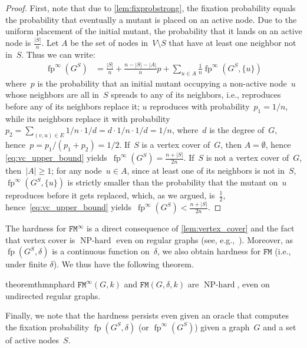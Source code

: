 \documentclass[letterpaper]{article}
\newcommand{\fp}{\operatorname{fp}}
\newcommand{\NodeActivationMoran}{\texttt{FM}}
\newcommand{\NodeActivationMoranStrong}{\texttt{FM}^{\infty}}
\newcommand{\FitAdv}{\delta}
\newcommand{\NPH}{\operatorname{NP-hard}}
\begin{document}
\begin{proof}
First, note that due to \cref{lem:fixprobstrong}, the fixation probability equals the probability that eventually a mutant is placed on an active node. Due to the uniform placement of the initial mutant, the probability that it lands on an active node is $\frac{|S|}{n}$.
Let $A$ be the set of nodes in~$V\setminus S$ that have at least one neighbor not in~$S$.
Thus we can write:
\begin{align}
\fp^{\infty}(G^{S}) &= {\textstyle \frac{|S|}{n} \!+\! \frac{n-|S|-|A|}{n}p} \!+\! \sum_{u\in A}{\textstyle \frac{1}{n}} \fp^{\infty}(G^S\!, \{u\})
\label{eq:vc_upper_bound}
\end{align}
where~$p$ is the probability that an initial mutant occupying a non-active node~$u$ whose neighbors are all in~$S$ spreads to any of its neighbors, i.e., reproduces before any of its neighbors replace it; $u$ reproduces with probability~$p_1 = 1/n$, while its neighbors replace it with probability $p_2 = \sum_{(v,u)\in E} 1/n\cdot 1/d = d \cdot 1/n\cdot 1/d = 1/n$, where~$d$ is the degree of~$G$, hence~$p = p_1/(p_1+p_2) = 1/2$.
If~$S$ is a vertex cover of~$G$, then $A = \emptyset$, hence \cref{eq:vc_upper_bound} yields~$\fp^{\infty}(G^{S}) = \frac{n+|S|}{2n}$.
If~$S$ is not a vertex cover of~$G$, then~$|A|\geq 1$; for any node~$u \in A$, since at least one of its neighbors is not in~$S$, $\fp^{\infty}(G^S, \{u\})$ is strictly smaller than the probability that the mutant on~$u$ reproduces before it gets replaced, which, as we argued, is~$\frac{1}{2}$, hence~\cref{eq:vc_upper_bound} yields~$\fp^{\infty}(G^{S})<\frac{n+|S|}{2n}$. %
\end{proof}

The hardness for $\NodeActivationMoranStrong$  is a direct consequence of \cref{lem:vertex_cover} and the fact that vertex cover is $\NPH$ even on regular graphs (see, e.g.,~\cite{Feige2003}). Moreover, as $\fp(G^S, \FitAdv)$ is a continuous function on~$\FitAdv$, we also obtain hardness for $\NodeActivationMoran$ (i.e., under finite $\FitAdv$).
We thus have the following theorem.

\begin{restatable}{theorem}{thmnphard}\label{thm:np_hard}
$\NodeActivationMoranStrong(G,k)$ and $\NodeActivationMoran(G,\FitAdv,k)$ are $\NPH$, even on undirected regular graphs.
\end{restatable}

Finally, we note that the hardness persists even given an oracle that computes the fixation probability $\fp(G^S,\FitAdv)$ (or $\fp^{\infty}(G^S)$) given a graph~$G$ and a set of active nodes~$S$.
\end{document}
